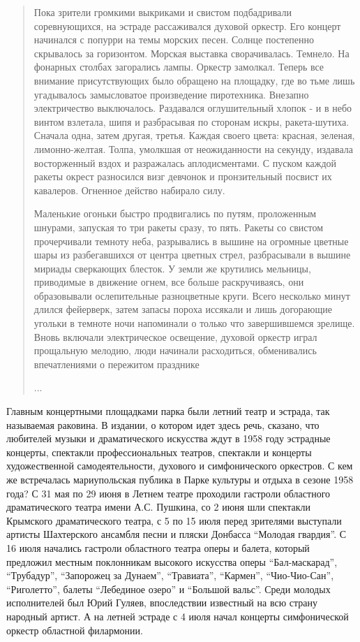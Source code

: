 \begin{quote}
{Пока зрители громкими выкриками и свистом подбадривали соревнующихся, на
эстраде рассаживался духовой оркестр. Его концерт начинался с попурри на темы
морских песен. Солнце постепенно скрывалось за горизонтом. Морская выставка
сворачивалась. Темнело. На фонарных столбах загорались лампы. Оркестр замолкал.
Теперь все внимание присутствующих было обращено на площадку, где во тьме лишь
угадывалось замысловатое произведение пиротехника. Внезапно электричество
выключалось. Раздавался оглушительный хлопок - и в небо винтом взлетала, шипя и
разбрасывая по сторонам искры, ракета-шутиха. Сначала одна, затем другая,
третья. Каждая своего цвета: красная, зеленая, лимонно-желтая. Толпа, умолкшая
от неожиданности на секунду, издавала восторженный вздох и разражалась
аплодисментами. С пуском каждой ракеты окрест разносился визг девчонок и
пронзительный посвист их кавалеров. Огненное действо набирало силу.

Маленькие огоньки быстро продвигались по путям, проложенным шнурами, запуская
то три ракеты сразу, то пять. Ракеты со свистом прочерчивали темноту неба,
разрывались в вышине на огромные цветные шары из разбегавшихся от центра
цветных стрел, разбрасывали в вышине мириады сверкающих блесток. У земли же
крутились мельницы, приводимые в движение огнем, все больше раскручиваясь, они
образовывали ослепительные разноцветные круги. Всего несколько минут длился
фейерверк, затем запасы пороха иссякали и лишь догорающие угольки в темноте
ночи напоминали о только что завершившемся зрелище. Вновь включали
электрическое освещение, духовой оркестр играл прощальную мелодию, люди
начинали расходиться, обменивались впечатлениями о пережитом празднике}... 
	
\end{quote}

Главным концертными площадками парка были летний театр и эстрада, так
называемая раковина. В издании, о котором идет здесь речь, сказано, что
любителей музыки и драматического искусства ждут в 1958 году эстрадные
концерты, спектакли профессиональных театров, спектакли и концерты
художественной самодеятельности, духового и симфонического оркестров. С кем же
встречалась мариупольская публика в Парке культуры и отдыха в сезоне 1958 года?
С 31 мая по 29 июня в Летнем театре проходили гастроли областного
драматического театра имени А.С. Пушкина, со 2 июня шли спектакли Крымского
драматического театра, с 5 по 15 июля перед зрителями выступали артисты
Шахтерского ансамбля песни и пляски Донбасса \enquote{Молодая гвардия}. С 16 июля
начались гастроли областного театра оперы и балета, который предложил местным
поклонникам высокого искусства оперы \enquote{Бал-маскарад}, \enquote{Трубадур}, \enquote{Запорожец за
Дунаем}, \enquote{Травиата}, \enquote{Кармен}, \enquote{Чио-Чио-Сан}, \enquote{Риголетто}, балеты \enquote{Лебединое
озеро} и \enquote{Большой вальс}. Среди молодых исполнителей был Юрий Гуляев,
впоследствии известный на всю страну народный артист. А на летней эстраде с 4
июля начал концерты симфонической оркестр областной филармонии.

